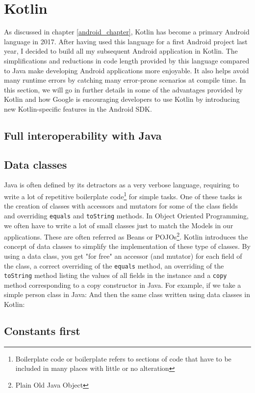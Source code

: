 \documentclass[11pt,a4paper]{report}
\begin{document}
\section{Kotlin}
\label{kotlin}
As discussed in chapter \ref{android_chapter}, Kotlin has become a primary Android language in 2017. After having used this language for a first Android project last year, I decided to build all my subsequent Android application in Kotlin. The simplifications and reductions in code length provided by this language compared to Java make developing Android applications more enjoyable. It also helps avoid many runtime errors by catching many error-prone scenarios at compile time. In this section, we will go in further details in some of the advantages provided by Kotlin and how Google is encouraging developers to use Kotlin by introducing new Kotlin-specific features in the Android SDK.
\subsection{Full interoperability with Java}
\subsection{Data classes}
Java is often defined by its detractors as a very verbose language, requiring to write a lot of repetitive boilerplate code\footnote{Boilerplate code or boilerplate refers to sections of code that have to be included in many places with little or no alteration\cite{wiki:define:boilerplate}} for simple tasks. One of these tasks is the creation of classes with accessors and mutators for some of the class fields and overriding \verb+equals+ and \verb+toString+ methods. In Object Oriented Programming, we often have to write a lot of small classes just to match the Models in our applications. These are often referred as Beans or POJOs\footnote{Plain Old Java Object}. Kotlin introduces the concept of data classes\cite{kotlin:doc:data_classes} to simplify the implementation of these type of classes. By using a data class, you get "for free" an accessor (and mutator) for each field of the class, a correct overriding of the \verb+equals+ method, an overriding of the \verb+toString+ method listing the values of all fields in the instance and a \verb+copy+ method corresponding to a copy constructor in Java. For example, if we take a simple person class in Java:
And then the same class written using data classes in Kotlin:
\subsection{Constants first}
\end{document}
